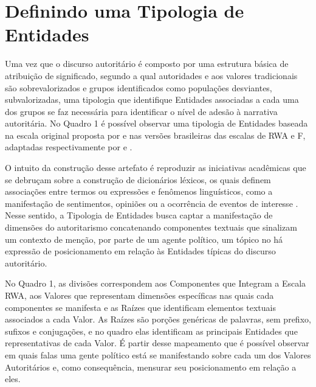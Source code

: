 \documentclass[
12pt,				%
openright,			%
twoside,			%
a4paper,			%
english,			%
french,				%
spanish,			%
brazil				%
]{abntex2}
\begin{document}
\section{Definindo uma Tipologia de Entidades}

Uma vez que o discurso autoritário é composto por uma estrutura básica de atribuição de significado, segundo a qual autoridades e aos valores tradicionais são sobrevalorizados e grupos identificados como populações desviantes, subvalorizadas, uma tipologia que identifique Entidades associadas a cada uma dos grupos se faz necessária para identificar o nível de adesão à narrativa autoritária. No Quadro 1 é possível observar uma tipologia de Entidades baseada na escala original proposta por  e nas versões brasileiras das escalas de RWA e F, adaptadas respectivamente por  e . 

O intuito da construção desse artefato é reproduzir as iniciativas acadêmicas que se debruçam sobre a construção de dicionários léxicos, os quais definem associações entre termos ou expressões e fenômenos linguísticos, como a manifestação de sentimentos, opiniões ou a ocorrência de eventos de interesse \cite{freitas2012vampiro, freitas2013construccao, freitas2014sparkling}. Nesse sentido, a Tipologia de Entidades busca captar a manifestação de dimensões do autoritarismo concatenando componentes textuais que sinalizam um contexto de menção, por parte de um agente político, um tópico no há expressão de posicionamento em relação às Entidades típicas do discurso autoritário.

No Quadro 1, as divisões correspondem aos Componentes que Integram a Escala RWA, aos Valores que representam dimensões específicas nas quais cada componentes se manifesta e as Raízes que identificam elementos textuais associados a cada Valor. As Raízes são porções genéricas de palavras, sem prefixo, sufixos e conjugações, e no quadro elas identificam as principais Entidades que representativas de cada Valor. É partir desse mapeamento que é possível observar em quais falas uma gente político está se manifestando sobre cada um dos Valores Autoritários e, como consequência, mensurar seu posicionamento em relação a eles.
\end{document}
